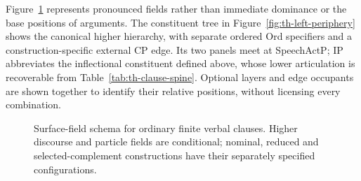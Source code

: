 Figure~\ref{fig:th-clause-fields} represents pronounced fields rather than
immediate dominance or the base positions of arguments. The constituent tree
in Figure~\ref{fig:th-left-periphery} shows the canonical higher hierarchy,
with separate ordered Ord specifiers and a construction-specific external CP
edge. Its two panels meet at SpeechActP; IP abbreviates the inflectional
constituent defined above, whose lower articulation is recoverable from
Table~\ref{tab:th-clause-spine}. Optional layers and edge occupants are shown
together to identify their relative positions, without licensing every
combination.

\begin{figure}[ht]
  \centering
  \caption{Surface-field schema for ordinary finite verbal clauses. Higher
  discourse and particle fields are conditional; nominal, reduced and
  selected-complement constructions have their separately specified
  configurations.}\label{fig:th-clause-fields}
\end{figure}

